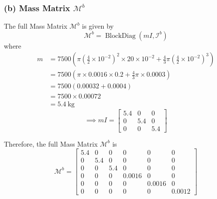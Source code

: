 \subsubsection*{(b) Mass Matrix \( \mathcal{M}^{b} \)}

The full Mass Matrix \( \mathcal{M}^{b} \) is given by
\begin{equation*}
    \mathcal{M}^{b}=\operatorname{BlockDiag}\left(m I, \mathcal{I}^{b}\right)
\end{equation*}
where
\begin{align*}
    m & =7500\left(\pi\left(\frac{4}{2} \times 10^{-2}\right)^{2} \times 20 \times 10^{-2}+\frac{4}{3} \pi\left(\frac{4}{2} \times 10^{-2}\right)^{3}\right) \\
      & =7500\left(\pi \times 0.0016 \times 0.2+\frac{4}{3} \pi \times 0.0003\right)                                                                         \\
      & =7500\left(0.00032+0.0004\right)                                                                                                                     \\
      & =7500 \times 0.00072                                                                                                                                 \\
      & =5.4 \mathrm{~kg}
\end{align*}
\begin{equation*}
    \implies
    m I=\begin{bmatrix}
        5.4 & 0   & 0   \\
        0   & 5.4 & 0   \\
        0   & 0   & 5.4
    \end{bmatrix}
\end{equation*}

Therefore, the full Mass Matrix \( \mathcal{M}^{b} \) is
\begin{equation*}
    \boxed{
        \mathcal{M}^{b}
        =
        \begin{bmatrix}
            5.4 & 0   & 0   & 0      & 0      & 0      \\
            0   & 5.4 & 0   & 0      & 0      & 0      \\
            0   & 0   & 5.4 & 0      & 0      & 0      \\
            0   & 0   & 0   & 0.0016 & 0      & 0      \\
            0   & 0   & 0   & 0      & 0.0016 & 0      \\
            0   & 0   & 0   & 0      & 0      & 0.0012
        \end{bmatrix}
    }
\end{equation*}

